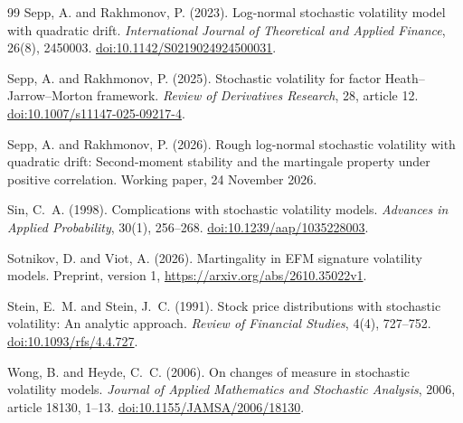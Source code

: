 \documentclass[11pt,a4paper]{article}
\theoremstyle{definition}
\theoremstyle{remark}
\begin{document}
\begin{thebibliography}{99}
Sepp, A. and Rakhmonov, P. (2023).
Log-normal stochastic volatility model with quadratic drift.
\emph{International Journal of Theoretical and Applied Finance},
26(8), 2450003.
\href{https://doi.org/10.1142/S0219024924500031}{doi:10.1142/S0219024924500031}.

Sepp, A. and Rakhmonov, P. (2025).
Stochastic volatility for factor Heath--Jarrow--Morton framework.
\emph{Review of Derivatives Research}, 28, article 12.
\href{https://doi.org/10.1007/s11147-025-09217-4}{doi:10.1007/s11147-025-09217-4}.

Sepp, A. and Rakhmonov, P. (2026).
Rough log-normal stochastic volatility with quadratic drift: Second-moment stability and the martingale property under positive correlation.
Working paper, 24 November 2026.

Sin, C.~A. (1998).
Complications with stochastic volatility models.
\emph{Advances in Applied Probability}, 30(1), 256--268.
\href{https://doi.org/10.1239/aap/1035228003}{doi:10.1239/aap/1035228003}.

Sotnikov, D. and Viot, A. (2026).
Martingality in EFM signature volatility models.
Preprint, version 1, \url{https://arxiv.org/abs/2610.35022v1}.

Stein, E.~M. and Stein, J.~C. (1991).
Stock price distributions with stochastic volatility: An analytic approach.
\emph{Review of Financial Studies}, 4(4), 727--752.
\href{https://doi.org/10.1093/rfs/4.4.727}{doi:10.1093/rfs/4.4.727}.

Wong, B. and Heyde, C.~C. (2006).
On changes of measure in stochastic volatility models.
\emph{Journal of Applied Mathematics and Stochastic Analysis}, 2006, article 18130, 1--13.
\href{https://doi.org/10.1155/JAMSA/2006/18130}{doi:10.1155/JAMSA/2006/18130}.

\end{thebibliography}
\end{document}
